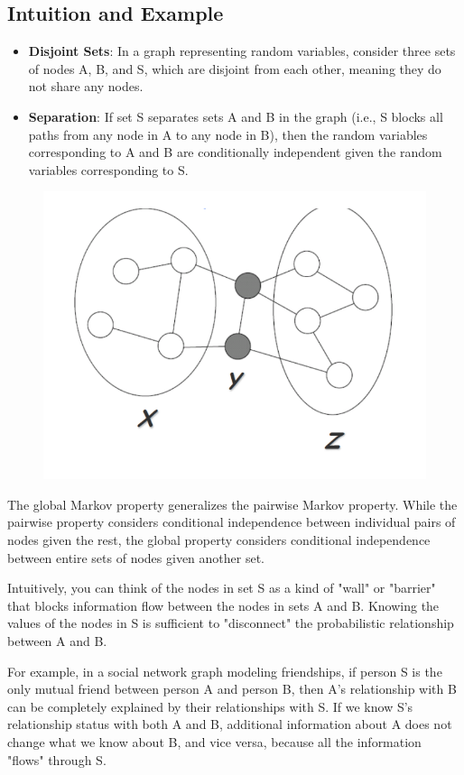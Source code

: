 \documentclass{article}
\begin{document}
\subsection{Intuition and Example}
\begin{itemize}
    \item \textbf{Disjoint Sets}: In a graph representing random variables, consider three sets of nodes A, B, and S, which are disjoint from each other, meaning they do not share any nodes.
    \item \textbf{Separation}: If set S separates sets A and B in the graph (i.e., S blocks all paths from any node in A to any node in B), then the random variables corresponding to A and B are conditionally independent given the random variables corresponding to S.
\end{itemize}

\begin{figure}
    \centering
    \includegraphics[width=0.5\linewidth]{overviews/graphical-models/figures/figure_GMP.png}
\end{figure}

The global Markov property generalizes the pairwise Markov property. While the pairwise property considers conditional independence between individual pairs of nodes given the rest, the global property considers conditional independence between entire sets of nodes given another set.

Intuitively, you can think of the nodes in set S as a kind of "wall" or "barrier" that blocks information flow between the nodes in sets A and B. Knowing the values of the nodes in S is sufficient to "disconnect" the probabilistic relationship between A and B.

For example, in a social network graph modeling friendships, if person S is the only mutual friend between person A and person B, then A's relationship with B can be completely explained by their relationships with S. If we know S's relationship status with both A and B, additional information about A does not change what we know about B, and vice versa, because all the information "flows" through S.
\end{document}
